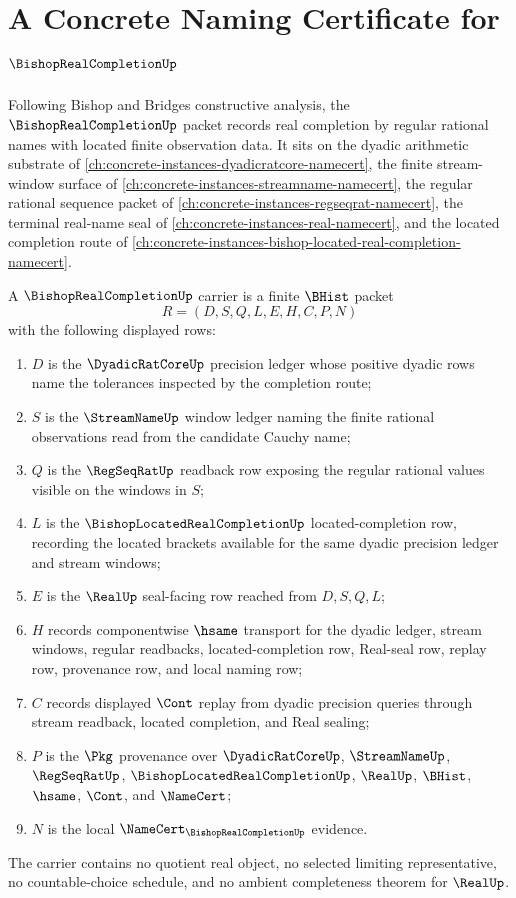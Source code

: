 \chapter{A Concrete Naming Certificate for $\BishopRealCompletionUp$}
\label{ch:concrete-instances-bishop-real-completion-namecert}

Following Bishop and Bridges constructive analysis, the $\BishopRealCompletionUp$ packet records real completion by regular rational names with located finite observation data. It sits on the dyadic arithmetic substrate of \autoref{ch:concrete-instances-dyadicratcore-namecert}, the finite stream-window surface of \autoref{ch:concrete-instances-streamname-namecert}, the regular rational sequence packet of \autoref{ch:concrete-instances-regseqrat-namecert}, the terminal real-name seal of \autoref{ch:concrete-instances-real-namecert}, and the located completion route of \autoref{ch:concrete-instances-bishop-located-real-completion-namecert}.

\begin{definition}
\label{def:bishop-real-completion-carrier}
A $\BishopRealCompletionUp$ carrier is a finite $\BHist$ packet
$$
R=(D,S,Q,L,E,H,C,P,N)
$$
with the following displayed rows:
\begin{enumerate}
\item $D$ is the $\DyadicRatCoreUp$ precision ledger whose positive dyadic rows name the tolerances inspected by the completion route;
\item $S$ is the $\StreamNameUp$ window ledger naming the finite rational observations read from the candidate Cauchy name;
\item $Q$ is the $\RegSeqRatUp$ readback row exposing the regular rational values visible on the windows in $S$;
\item $L$ is the $\BishopLocatedRealCompletionUp$ located-completion row, recording the located brackets available for the same dyadic precision ledger and stream windows;
\item $E$ is the $\RealUp$ seal-facing row reached from $D,S,Q,L$;
\item $H$ records componentwise $\hsame$ transport for the dyadic ledger, stream windows, regular readbacks, located-completion row, Real-seal row, replay row, provenance row, and local naming row;
\item $C$ records displayed $\Cont$ replay from dyadic precision queries through stream readback, located completion, and Real sealing;
\item $P$ is the $\Pkg$ provenance over $\DyadicRatCoreUp$, $\StreamNameUp$, $\RegSeqRatUp$, $\BishopLocatedRealCompletionUp$, $\RealUp$, $\BHist$, $\hsame$, $\Cont$, and $\NameCert$;
\item $N$ is the local $\NameCert_{\BishopRealCompletionUp}$ evidence.
\end{enumerate}
The carrier contains no quotient real object, no selected limiting representative, no countable-choice schedule, and no ambient completeness theorem for $\RealUp$.
\end{definition}

